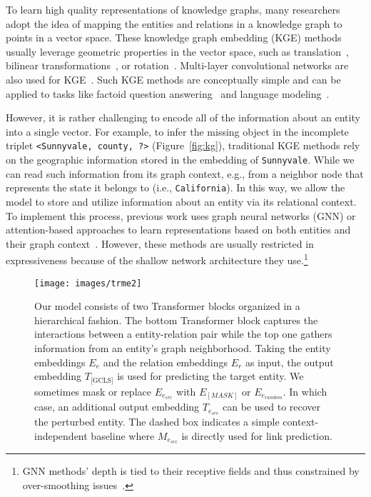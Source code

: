 \documentclass[11pt]{article}
\begin{document}
To learn high quality representations of knowledge graphs, many researchers adopt the idea of mapping the entities and relations in a knowledge graph to points in a vector space.
These knowledge graph embedding (KGE) methods usually leverage geometric properties in the vector space, such as translation~\cite{bordes2013transe}, bilinear transformations~\cite[DistMult]{yang2014distmult}, or rotation~\cite{sun2018rotate}.
Multi-layer convolutional networks are also used for KGE~\cite[ConvE]{dettmers2018conve}.
Such KGE methods are conceptually simple and can be applied to tasks like factoid question answering~\cite{saxena-etal-2020-improving} and language modeling~\cite{peters-etal-2019-knowledge}.





However, it is rather challenging to encode all of the information about an entity into a single vector.
For example, to infer the missing object in the incomplete triplet \texttt{<Sunnyvale, county, ?>} (Figure~\ref{fig:kg}), traditional KGE methods rely on the geographic information stored in the embedding of \texttt{Sunnyvale}.
While we can read such information from its graph context, e.g., from a neighbor node that represents the state it belongs to (i.e., \texttt{California}).
In this way, we allow the model to store and utilize information about an entity via its relational context.
To implement this process, previous work uses graph neural networks (GNN) or attention-based approaches to learn representations based on both entities and their graph context~\cite{kipf2016semi,bansal-etal-2019-a2n,Vashishth2020Composition}.
However, these methods are usually restricted in expressiveness because of the shallow network architecture they use.\footnote{GNN methods' depth is tied to their receptive fields and thus constrained by over-smoothing issues~\cite{liu2020towards}.}



\begin{figure*}[tb]
  \centering
  \texttt{[image: images/trme2]}
  \caption{Our model consists of two Transformer blocks organized in a hierarchical fashion. The bottom Transformer block captures the interactions between a entity-relation pair while the top one gathers information from an entity's graph neighborhood. Taking the entity embeddings $E_e$ and the relation embeddings $E_r$ as input, the output embedding $T_{\text{[GCLS]}}$ is used for predicting the target entity. We sometimes mask or replace $E_{e_{\mathit{src}}}$ with $E_{[\mathit{MASK}]}$ or $E_{e_{\mathit{random}}}$. In which case, an additional output embedding $T_{e_{\mathit{src}}}$ can be used to recover the perturbed entity.
  The dashed box indicates a simple context-independent baseline where $M_{e_{\mathit{src}}}$ is directly used for link prediction.}
  \label{fig:model}
\end{figure*}
\end{document}

